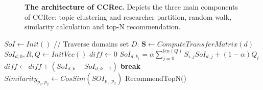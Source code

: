 \documentclass[10pt,letterpaper]{article}
\newcommand{\algorithmicbreak}{\textbf{break}}
\newcommand{\BREAK}{\State \algorithmicbreak}
\begin{document}
\begin{figure}[!hbt]
\caption{{\bf The architecture of CCRec.} Depicts the three main components of CCRec: topic clustering and researcher partition, random walk, similarity calculation and top-N recommendation.}
\label{Fig. 1}
\end{figure}

\begin{algorithm}[!hbt]
  \label{Algorithm1}
  \begin{algorithmic}[1]
  \State $SoI \leftarrow Init()$
   // Traverse domains set $D$.
        \State $\mathbf{S} \leftarrow ComputeTransferMatrix(d)$
        \State $SoI_{d,0}, R, Q \leftarrow InitVec()$
            \State $diff \leftarrow 0$
                \State $SoI_{d,k_{i}} = \alpha\sum_{j=0}^{len(Q)} S_{i,j}SoI_{d,j}+(1-\alpha) Q_{i}$
                \State $diff \leftarrow diff +(SoI_{d,k}-SoI_{d,k-1})$
            \EndFor
                \BREAK
            \EndIf
        \EndFor
  \EndFor
            \State $Similarity_{p_{1},p_{2}} \leftarrow CosSim(SOI_{p_{1},p_{2}})$
        \EndFor
  \EndFor
  \State RecommendTopN()
  \end{algorithmic}
\end{algorithm}
\end{document}
